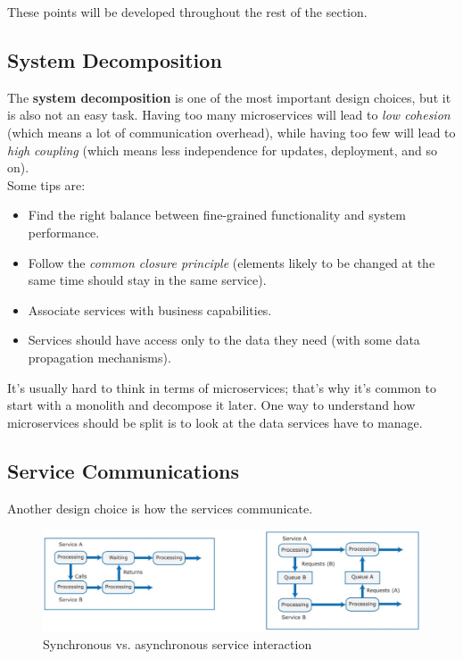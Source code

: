 \noindent These points will be developed throughout the rest of the section.

\subsection{System Decomposition}

The \textbf{system decomposition} is one of the most important design choices, but it is also not an easy task. Having too many microservices will lead to \textit{low cohesion} (which means a lot of communication overhead), while having too few will lead to \textit{high coupling} (which means less independence for updates, deployment, and so on).\\
\newline \noindent Some tips are:
\begin{itemize}
    \item Find the right balance between fine-grained functionality and system performance.
    \item Follow the \textit{common closure principle} (elements likely to be changed at the same time should stay in the same service).
    \item Associate services with business capabilities.
    \item Services should have access only to the data they need (with some data propagation mechanisms).
\end{itemize}

It's usually hard to think in terms of microservices; that's why it's common to start with a monolith and decompose it later. One way to understand how microservices should be split is to look at the data services have to manage.

\subsection{Service Communications}

Another design choice is how the services communicate.

\begin{figure} [H]
    \centering
    \includegraphics[width=1\textwidth]{images/Microservices/sync-vs-async.PNG}
    \caption{Synchronous vs. asynchronous service interaction}
    \label{fig:sync-vs-async}
\end{figure} 

